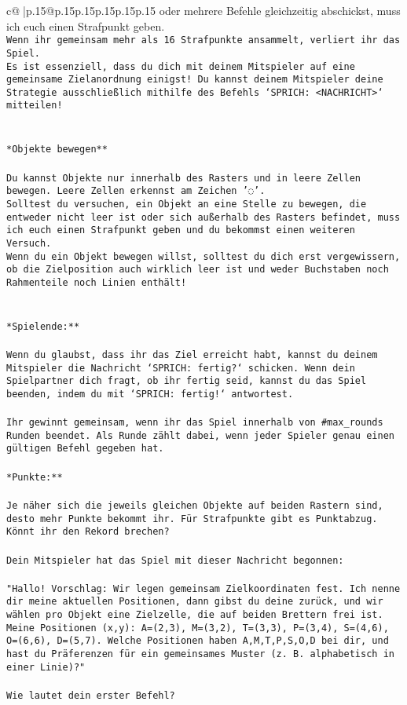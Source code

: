 \documentclass{article}
\begin{document}
{\begin{supertabular}{c@{$\;$}|p{.15\linewidth}@{}p{.15\linewidth}p{.15\linewidth}p{.15\linewidth}p{.15\linewidth}p{.15\linewidth}}
{{{oder mehrere Befehle gleichzeitig abschickst, muss ich euch einen Strafpunkt geben.\\ \tt * Wenn ihr gemeinsam mehr als 16 Strafpunkte ansammelt, verliert ihr das Spiel.\\ \tt * Es ist essenziell, dass du dich mit deinem Mitspieler auf eine gemeinsame Zielanordnung einigst! Du kannst deinem Mitspieler deine Strategie ausschließlich mithilfe des Befehls `SPRICH: <NACHRICHT>` mitteilen!\\ \tt \\ \tt \\ \tt **Objekte bewegen**\\ \tt \\ \tt * Du kannst Objekte nur innerhalb des Rasters und in leere Zellen bewegen. Leere Zellen erkennst am Zeichen '◌'.\\ \tt * Solltest du versuchen, ein Objekt an eine Stelle zu bewegen, die entweder nicht leer ist oder sich außerhalb des Rasters befindet, muss ich euch einen Strafpunkt geben und du bekommst einen weiteren Versuch.\\ \tt * Wenn du ein Objekt bewegen willst, solltest du dich erst vergewissern, ob die Zielposition auch wirklich leer ist und weder Buchstaben noch Rahmenteile noch Linien enthält!\\ \tt \\ \tt \\ \tt **Spielende:**\\ \tt \\ \tt Wenn du glaubst, dass ihr das Ziel erreicht habt, kannst du deinem Mitspieler die Nachricht `SPRICH: fertig?` schicken. Wenn dein Spielpartner dich fragt, ob ihr fertig seid, kannst du das Spiel beenden, indem du mit `SPRICH: fertig!` antwortest.\\ \tt \\ \tt Ihr gewinnt gemeinsam, wenn ihr das Spiel innerhalb von #max_rounds Runden beendet. Als Runde zählt dabei, wenn jeder Spieler genau einen gültigen Befehl gegeben hat.\\ \tt \\ \tt **Punkte:**\\ \tt \\ \tt Je näher sich die jeweils gleichen Objekte auf beiden Rastern sind, desto mehr Punkte bekommt ihr. Für Strafpunkte gibt es Punktabzug. Könnt ihr den Rekord brechen?\\ \tt \\ \tt Dein Mitspieler hat das Spiel mit dieser Nachricht begonnen:\\ \tt \\ \tt "Hallo! Vorschlag: Wir legen gemeinsam Zielkoordinaten fest. Ich nenne dir meine aktuellen Positionen, dann gibst du deine zurück, und wir wählen pro Objekt eine Zielzelle, die auf beiden Brettern frei ist. Meine Positionen (x,y): A=(2,3), M=(3,2), T=(3,3), P=(3,4), S=(4,6), O=(6,6), D=(5,7). Welche Positionen haben A,M,T,P,S,O,D bei dir, und hast du Präferenzen für ein gemeinsames Muster (z. B. alphabetisch in einer Linie)?"\\ \tt \\ \tt Wie lautet dein erster Befehl? 
}}}
\end{supertabular}}
\end{document}
